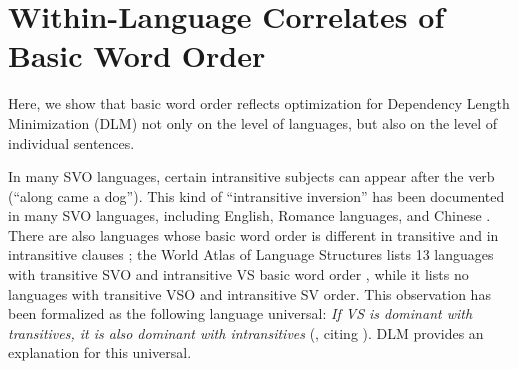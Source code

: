 \documentclass[11pt,a4paper]{article}
\begin{document}








\section{Within-Language Correlates of Basic Word Order}

Here, we show that basic word order reflects optimization for Dependency Length Minimization (DLM) not only on the level of languages, but also on the level of individual sentences.

In many SVO languages, certain intransitive subjects can appear after the verb (``along came a dog'').
This kind of ``intransitive inversion'' has been documented in many SVO languages, including English, Romance languages, and Chinese \citep[Chapter 17.2]{li1981mandarin}.
There are also languages whose basic word order is different in transitive and in intransitive clauses \citep{wals-82}; the World Atlas of Language Structures lists 13 languages with transitive SVO and intransitive VS basic word order \citep{wals-81,wals-82}, while it lists no languages with transitive VSO and intransitive SV order.
This observation has been formalized as the following language universal: \textit{If VS is dominant with transitives, it is also dominant with intransitives} (\citet[No 344]{plank2000the}, citing \citet{kozinsky1981Nekotorye}).
DLM provides an explanation for this universal.
\end{document}
